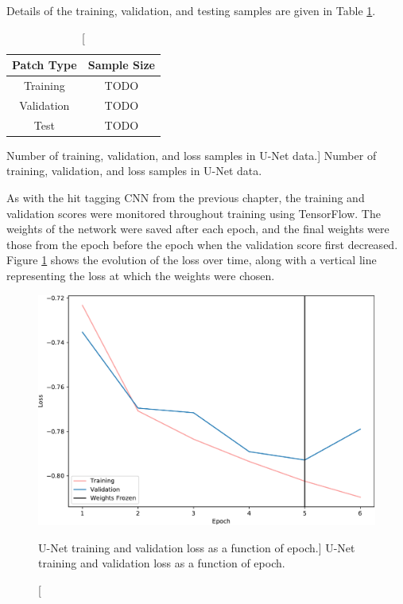 Details of the training, validation, and testing samples are given in Table
\ref{tab:unet_train}. 
\begin{table}
	\centering
	\begin{tabular}{c|c}
		Patch Type & Sample Size \\ \hline
		Training   & TODO \\
		Validation & TODO \\
		Test       & TODO    
	\end{tabular}
	\caption
	[Number of training, validation, and loss samples in U-Net data.]
	{Number of training, validation, and loss samples in U-Net data.}
	\label{tab:unet_train}
\end{table}

As with the hit tagging CNN from the previous chapter, the training and
validation scores were monitored throughout training using TensorFlow. The
weights of the network were saved after each epoch, and the final weights were
those from the epoch before the epoch when the validation score first decreased.
Figure \ref{fig:unet_loss} shows the evolution of the loss over time, along with
a vertical line representing the loss at which the weights were chosen.
\begin{figure}
	\centering
	\includegraphics[width=\textwidth]{figures/unet_loss.pdf}
	\caption
	[U-Net training and validation loss as a function of epoch.]
	{U-Net training and validation loss as a function of epoch.}
	\label{fig:unet_loss}
\end{figure}

